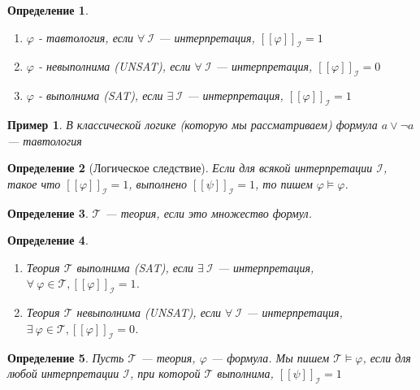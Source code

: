 \documentclass[12pt]{article}
\newtheorem{definition}{Определение}
\newtheorem{example}{Пример}
\begin{document}
\begin{definition}
	\leavevmode
	\begin{enumerate}
		\item $\varphi$ - тавтология, если $\forall \ \mathcal{I}$ --- интерпретация, $[\![ \varphi ]\!]_{\mathcal{I}} = 1$
		\item $\varphi$ - невыполнима (UNSAT), если $\forall \ \mathcal{I}$ --- интерпретация, $[\![ \varphi ]\!]_{\mathcal{I}} = 0$
		\item $\varphi$ - выполнима (SAT), если $\exists \ \mathcal{I}$ --- интерпретация, $[\![ \varphi ]\!]_{\mathcal{I}} = 1$

	\end{enumerate}
\end{definition}
\begin{example}
	В классической логике (которую мы рассматриваем) формула $a \lor \lnot a$ ---  тавтология
\end{example}

\begin{definition}[Логическое следствие]
	Если для всякой интерпретации $\mathcal{I}$, такое что $[\![ \varphi ]\!]_{\mathcal{I}} = 1$, выполнено $[\![ \psi ]\!]_{\mathcal{I}} = 1$, то пишем $\varphi \models \varphi$.
\end{definition}

\begin{definition}
	$\mathcal{T}$ --- теория, если это множество формул.
\end{definition}

\begin{definition}
	\leavevmode
	\begin{enumerate}
		\item Теория $\mathcal{T}$ выполнима (SAT), если $\exists \ \mathcal{I}$ --- интерпретация, $\forall \ \varphi \in \mathcal{T}, [\![ \varphi ]\!]_{\mathcal{I}} = 1$.
		\item Теория $\mathcal{T}$ невыполнима (UNSAT), если $\forall \ \mathcal{I}$ --- интерпретация, $\exists \ \varphi \in \mathcal{T}, [\![ \varphi ]\!]_{\mathcal{I}} = 0$.
	\end{enumerate}
\end{definition}

\begin{definition}
	Пусть $\mathcal{T}$ --- теория, $\varphi$ --- формула.
	Мы пишем $\mathcal{T} \models \varphi$, если для любой интерпретации $\mathcal{I}$, при которой $\mathcal{T}$ выполнима, $[\![ \psi ]\!]_{\mathcal{I}} = 1$
\end{definition}
\end{document}
